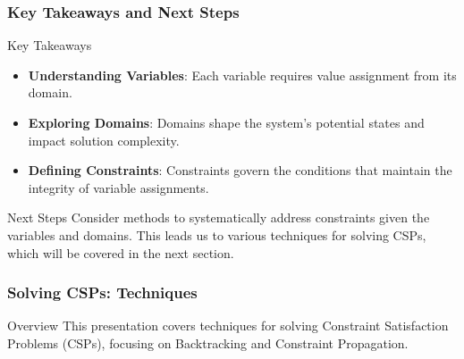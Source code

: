 \documentclass[aspectratio=169]{beamer}
\begin{document}
\begin{frame}[fragile]
    \frametitle{Key Takeaways and Next Steps}
    \begin{block}{Key Takeaways}
        \begin{itemize}
            \item \textbf{Understanding Variables}: Each variable requires value assignment from its domain.
            \item \textbf{Exploring Domains}: Domains shape the system's potential states and impact solution complexity.
            \item \textbf{Defining Constraints}: Constraints govern the conditions that maintain the integrity of variable assignments.
        \end{itemize}
    \end{block}

    \begin{block}{Next Steps}
        Consider methods to systematically address constraints given the variables and domains. This leads us to various techniques for solving CSPs, which will be covered in the next section.
    \end{block}
\end{frame}

\begin{frame}[fragile]
    \frametitle{Solving CSPs: Techniques}
    \begin{block}{Overview}
        This presentation covers techniques for solving Constraint Satisfaction Problems (CSPs), focusing on Backtracking and Constraint Propagation.
    \end{block}
\end{frame}
\end{document}
